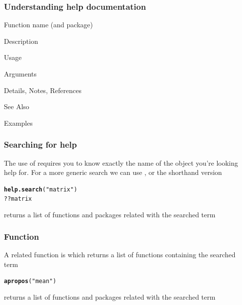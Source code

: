 \documentclass[12pt]{beamer}\usepackage[]{graphicx}\usepackage[]{color}
\makeatletter
\newcommand{\hlstr}[1]{\textcolor[rgb]{0.192,0.494,0.8}{#1}}%
\newcommand{\hlopt}[1]{\textcolor[rgb]{0,0,0}{#1}}%
\newcommand{\hlstd}[1]{\textcolor[rgb]{0.345,0.345,0.345}{#1}}%
\newcommand{\hlkwd}[1]{\textcolor[rgb]{0.737,0.353,0.396}{\textbf{#1}}}%
\newenvironment{kframe}{%
 \def\at@end@of@kframe{}%
 \ifinner\ifhmode%
  \def\at@end@of@kframe{\end{minipage}}%
  \begin{minipage}{\columnwidth}%
 \fi\fi%
 \def\FrameCommand##1{\hskip\@totalleftmargin \hskip-\fboxsep
 \colorbox{shadecolor}{##1}\hskip-\fboxsep
     \hskip-\linewidth \hskip-\@totalleftmargin \hskip\columnwidth}%
 \MakeFramed {\advance\hsize-\width
   \@totalleftmargin\z@ \linewidth\hsize
   \@setminipage}}%
 {\par\unskip\endMakeFramed%
 \at@end@of@kframe}
\newenvironment{knitrout}{}{} %
\makeatother
\begin{document}

\begin{frame}[fragile]
\frametitle{Understanding help documentation}

\bi
  \item Function name (and package)
  \item Description
  \item Usage
  \item Arguments
  \item Details, Notes, References
  \item See Also
  \item Examples
\ei

\end{frame}


\begin{frame}[fragile]
\frametitle{Searching for help}

The use of  requires you to know exactly the name of the object you're looking help for. For a more generic search we can use {\hilit {}}, or the shorthand version 
\begin{knitrout}\footnotesize
{}\color{fgcolor}\begin{kframe}
\begin{alltt}
\hlkwd{help.search}\hlstd{(}\hlstr{"matrix"}\hlstd{)}
\hlopt{??}\hlstd{matrix}
\end{alltt}
\end{kframe}
\end{knitrout}

 returns a list of functions and packages related with the searched term

\end{frame}


\begin{frame}[fragile]
\frametitle{Function }

A related function is {\hilit {}} which returns a list of functions containing the searched term
\begin{knitrout}\footnotesize
{}\color{fgcolor}\begin{kframe}
\begin{alltt}
\hlkwd{apropos}\hlstd{(}\hlstr{"mean"}\hlstd{)}
\end{alltt}
\end{kframe}
\end{knitrout}

 returns a list of functions and packages related with the searched term

\end{frame}
\end{document}
